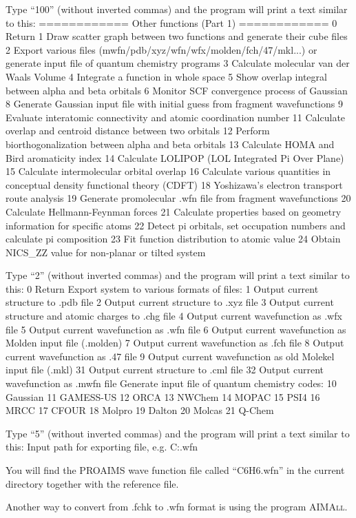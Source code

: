 \documentclass[a4paper,11pt,openany]{memoir}
\begin{document}
\begin{appendices}
\begin{consola}[	listing options={
		basicstyle=\ttfamily\tiny,
		numbers=left,
		numberstyle=\tiny\color{black}
	}]{Type ``100'' (without inverted commas) and the program will print a text similar to this:}
              ============ Other functions (Part 1) ============ 
0 Return
1 Draw scatter graph between two functions and generate their cube files
2 Export various files (mwfn/pdb/xyz/wfn/wfx/molden/fch/47/mkl...) or generate input file of quantum chemistry programs
3 Calculate molecular van der Waals Volume
4 Integrate a function in whole space
5 Show overlap integral between alpha and beta orbitals
6 Monitor SCF convergence process of Gaussian
8 Generate Gaussian input file with initial guess from fragment wavefunctions
9 Evaluate interatomic connectivity and atomic coordination number
11 Calculate overlap and centroid distance between two orbitals
12 Perform biorthogonalization between alpha and beta orbitals
13 Calculate HOMA and Bird aromaticity index
14 Calculate LOLIPOP (LOL Integrated Pi Over Plane)
15 Calculate intermolecular orbital overlap
16 Calculate various quantities in conceptual density functional theory (CDFT)
18 Yoshizawa's electron transport route analysis
19 Generate promolecular .wfn file from fragment wavefunctions
20 Calculate Hellmann-Feynman forces
21 Calculate properties based on geometry information for specific atoms
22 Detect pi orbitals, set occupation numbers and calculate pi composition
23 Fit function distribution to atomic value
24 Obtain NICS_ZZ value for non-planar or tilted system
\end{consola}
\begin{consola}{Type ``2'' (without inverted commas) and the program will print a text similar to this:}
0 Return
Export system to various formats of files:
1 Output current structure to .pdb file
2 Output current structure to .xyz file
3 Output current structure and atomic charges to .chg file
4 Output current wavefunction as .wfx file
5 Output current wavefunction as .wfn file
6 Output current wavefunction as Molden input file (.molden)
7 Output current wavefunction as .fch file
8 Output current wavefunction as .47 file
9 Output current wavefunction as old Molekel input file (.mkl)
31 Output current structure to .cml file
32 Output current wavefunction as .mwfn file
Generate input file of quantum chemistry codes:
10 Gaussian
11 GAMESS-US
12 ORCA               13 NWChem
14 MOPAC              15 PSI4
16 MRCC               17 CFOUR
18 Molpro             19 Dalton
20 Molcas             21 Q-Chem
\end{consola}
\begin{consola}{Type ``5'' (without inverted commas) and the program will print a text similar to this:}
Input path for exporting file, e.g. C:\ltwd.wfn
\end{consola}
You will find the PROAIMS wave function file called ``C6H6.wfn'' in the current directory together with the reference file.

Another way to convert from .fchk to .wfn format is using the program \textsc{AIMAll}.

\end{appendices}
\end{document}
